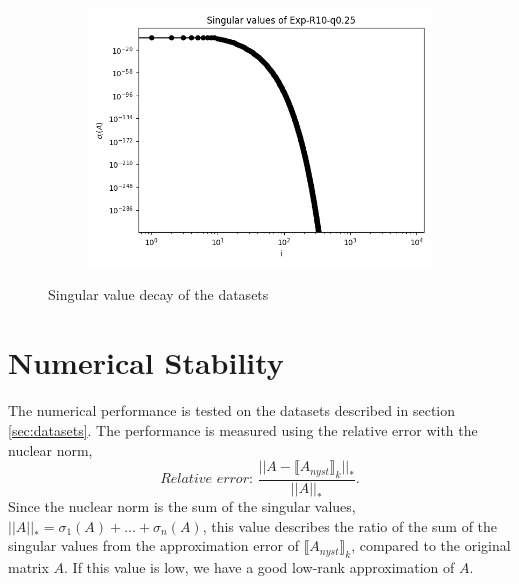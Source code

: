 \documentclass{article}
\theoremstyle{definition}
\begin{document}
\begin{figure}
\begin{subfigure}[t]{\textwidth+20pt\relax}
    \includegraphics[width=\dimexpr\linewidth-20pt\relax]{plots/singular_values/singular_values_Exp-R10-q0.25.png}
\end{subfigure}
\caption{Singular value decay of the datasets}
\label{fig:singularValue}
\end{figure}

\section{Numerical Stability} \label{sec:num_stability}

The numerical performance is tested on the datasets described in section \ref{sec:datasets}. The performance is measured using the relative error with the nuclear norm,
\begin{equation}
    \textit{Relative error: } \frac{||A-\llbracket A_{nyst}\rrbracket_k||_*}{||A||_*}.
\end{equation}
Since the nuclear norm is the sum of the singular values, $||A||_*=\sigma_1(A)+...+\sigma_n(A)$, this value describes the ratio of the sum of the singular values from the approximation error of $\llbracket A_{nyst}\rrbracket_k$, compared to the original matrix $A$. If this value is low, we have a good low-rank approximation of $A$. \newline
\end{document}
